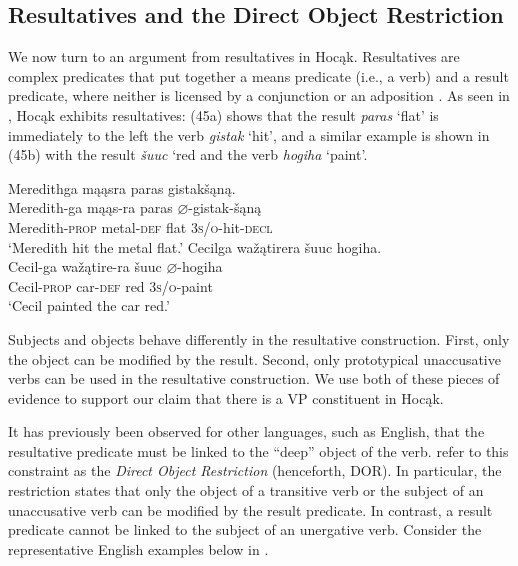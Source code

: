 \documentclass[output=paper]{LSP/langsci}
\begin{document}
\subsection{Resultatives and the Direct Object Restriction}

We now turn to an argument from resultatives in Hocąk. Resultatives are complex predicates that put together a means predicate (i.e., a verb) and a result predicate, where neither is licensed by a conjunction or an adposition \citep[507]{Williams2008}. As seen in , Hocąk exhibits resultatives: (45a) shows that the result \textit{paras} `flat' is immediately to the left the verb \textit{gistak} `hit', and a similar example is shown in (45b) with the result \textit{\v{s}uuc} `red and the verb \textit{hogiha} `paint'.

\begin{exe}
\ex\label{ex:jrs:45}
\begin{xlist}
\ex 
\glll Meredithga	mąąsra		paras	gistak\v{s}ąną.\\
Meredith-ga			mąąs-ra	paras	$\varnothing$-gistak-\v{s}ąną \\
	Meredith-\textsc{prop}		metal-\textsc{def}		flat	 \textsc{3s/o}-hit-\textsc{decl} \\
\trans `Meredith hit the metal flat.'
\ex 
\glll Cecilga	wa\v{z}ątirera	 \v{s}uuc	hogiha.\\
Cecil-ga	wa\v{z}ątire-ra \v{s}uuc	$\varnothing$-hogiha \\
	Cecil-\textsc{prop}	car-\textsc{def}	red		\textsc{3s/o}-paint \\
\trans `Cecil painted the car red.'
\end{xlist}
\end{exe}

Subjects and objects behave differently in the resultative construction. First, only the object can be modified by the result. Second, only prototypical unaccusative verbs can be used in the resultative construction. We use both of these pieces of evidence to support our claim that there is a VP constituent in Hocąk.

It has previously been observed for other languages, such as English, that the resultative predicate must be linked to the ``deep'' object of the verb.  \citet{LevinRappaportHovav1995} refer to this constraint as the \textit{Direct Object Restriction} (henceforth, DOR). In particular, the restriction states that only the object of a transitive verb or the subject of an unaccusative verb can be modified by the result predicate. In contrast, a result predicate cannot be linked to the subject of an unergative verb. Consider the representative English examples below in .
\end{document}
